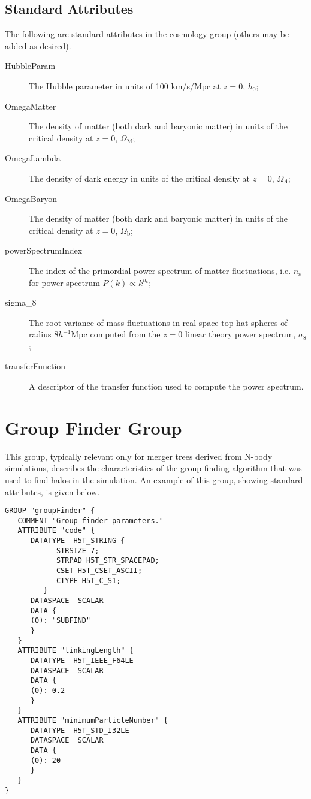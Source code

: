 \subsection{Standard Attributes}

The following are standard attributes in the {\normalfont \ttfamily cosmology} group (others may be added as desired).

\begin{description}
 \item [{\normalfont \ttfamily HubbleParam}] The Hubble parameter in units of 100 km/s/Mpc at $z=0$, $h_0$;
 \item [{\normalfont \ttfamily OmegaMatter}] The density of matter (both dark and baryonic matter) in units of the critical density at $z=0$, $\Omega_\mathrm{M}$;
 \item [{\normalfont \ttfamily OmegaLambda}] The density of dark energy in units of the critical density at $z=0$, $\Omega_\Lambda$;
 \item [{\normalfont \ttfamily OmegaBaryon}] The density of matter (both dark and baryonic matter) in units of the critical density at $z=0$, $\Omega_\mathrm{b}$;
 \item [{\normalfont \ttfamily powerSpectrumIndex}] The index of the primordial power spectrum of matter fluctuations, i.e. $n_\mathrm{s}$ for power spectrum $P(k) \propto k^{n_\mathrm{s}}$;
 \item [{\normalfont \ttfamily sigma\_8}] The root-variance of mass fluctuations in real space top-hat spheres of radius $8h^{-1}$Mpc computed from the $z=0$ linear theory power spectrum, $\sigma_8$;
 \item [{\normalfont \ttfamily transferFunction}] A descriptor of the transfer function used to compute the power spectrum.
\end{description}

\section{Group Finder Group}

This group, typically relevant only for merger trees derived from N-body simulations, describes the characteristics of the group finding algorithm that was used to find halos in the simulation. An example of this group, showing standard attributes, is given below.

\begin{verbatim}
GROUP "groupFinder" {
   COMMENT "Group finder parameters."
   ATTRIBUTE "code" {
      DATATYPE  H5T_STRING {
            STRSIZE 7;
            STRPAD H5T_STR_SPACEPAD;
            CSET H5T_CSET_ASCII;
            CTYPE H5T_C_S1;
         }
      DATASPACE  SCALAR
      DATA {
      (0): "SUBFIND"
      }
   }
   ATTRIBUTE "linkingLength" {
      DATATYPE  H5T_IEEE_F64LE
      DATASPACE  SCALAR
      DATA {
      (0): 0.2
      }
   }
   ATTRIBUTE "minimumParticleNumber" {
      DATATYPE  H5T_STD_I32LE
      DATASPACE  SCALAR
      DATA {
      (0): 20
      }
   }
}
\end{verbatim}

